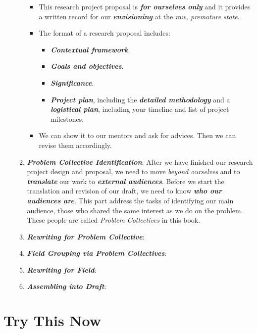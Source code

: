 \documentclass[11pt]{article}
\begin{document}
\begin{itemize}
\begin{enumerate}
\begin{itemize}
\item This research project proposal is \emph{\textbf{for ourselves only}} and it provides a written record for our \emph{\textbf{envisioning}} at the \emph{raw, premature state}. 

\item The format of a research proposal includes:
\begin{itemize}
\item \textbf{\emph{Contextual framework}}. 
\item \textbf{\emph{Goals and objectives}}.
\item \textbf{\emph{Significance}}. 

\item  \textbf{\emph{Project plan}}, including the \textbf{\emph{detailed methodology}} and a \textbf{\emph{logistical plan}}, including your timeline and list of project milestones.
\end{itemize}

\item We can show it to our mentors and ask for advices. Then we can revise them accordingly. 
\end{itemize}

\item  \emph{\textbf{Problem Collective Identification}}: After we have finished our research project design and proposal, we need to move \emph{beyond ourselves} and to \emph{\textbf{translate}} our work to \emph{\textbf{external audiences}}. Before we start the translation and revision of our draft, we need to know \emph{\textbf{who our audiences are}}. This part address the tasks of identifying our main audience, those who shared the same interest as we do on the problem. These people are called \emph{Problem Collectives} in this book. 

\item  \emph{\textbf{Rewriting for Problem Collective}}:

\item  \emph{\textbf{Field Grouping via Problem Collectives}}:

\item  \emph{\textbf{Rewriting for Field}}:

\item  \emph{\textbf{Assembling into Draft}}:
\end{enumerate}
\end{itemize}


\newpage
\section{Try This Now}
\end{document}
